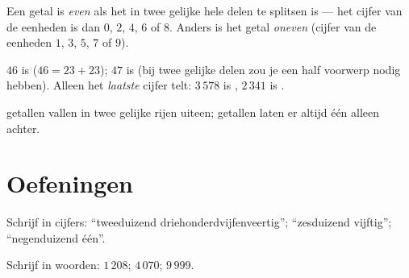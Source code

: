 \begin{definition}\label{def:g3:numbers:evenodd}
Een getal is \emph{even} als het in twee gelijke hele
delen te splitsen is --- het cijfer van de eenheden is dan $0$, $2$,
$4$, $6$ of $8$. Anders is het getal \emph{oneven}
(cijfer van de eenheden $1$, $3$, $5$, $7$ of $9$).
\end{definition}

\begin{example}
$46$ is  ($46 = 23 + 23$); $47$ is  (bij twee gelijke delen
zou je een half voorwerp nodig hebben). Alleen het \emph{laatste} cijfer
telt: $3\,578$ is , $2\,341$ is .
\end{example}

\begin{omfigure}

{\small {} getallen vallen in twee gelijke rijen uiteen; 
getallen laten er altijd één alleen achter.}
\end{omfigure}

\section{Oefeningen}

\begin{exercise}[$\star$]\label{exo:g3:numbers:1}
Schrijf in cijfers: ``tweeduizend driehonderdvijfenveertig'';
``zesduizend vijftig''; ``negenduizend één''.
\end{exercise}

\begin{exercise}[$\star$]\label{exo:g3:numbers:2}
Schrijf in woorden: $1\,208$; \quad $4\,070$; \quad $9\,999$.
\end{exercise}


